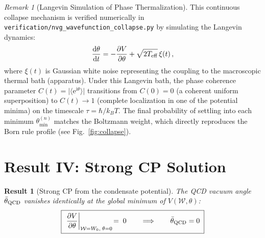 \documentclass[12pt,a4paper]{article}
\theoremstyle{plain}
\newtheorem{result}{Result}
\theoremstyle{definition}
\theoremstyle{remark}
\newtheorem*{remark}{Remark}
\newcommand{\hb}{\hbar}
\newcommand{\kB}{k_{\!B}}
\newcommand{\Wc}{\mathcal{W}}
\newcommand{\dd}{\mathrm{d}}
\newcommand{\ee}{\mathrm{e}}
\newcommand{\ii}{\mathrm{i}}
\begin{document}
\begin{remark}[Langevin Simulation of Phase Thermalization]
This continuous collapse mechanism is verified numerically in \texttt{verification/nvg\_wavefunction\_collapse.py} by simulating the Langevin dynamics:
\begin{equation}
  \frac{\dd\theta}{\dd t} = -\frac{\partial V}{\partial\theta} + \sqrt{2 T_{\rm eff}}\,\xi(t)\,,
\end{equation}
where $\xi(t)$ is Gaussian white noise representing the coupling to the macroscopic thermal bath (apparatus). Under this Langevin bath, the phase coherence parameter $C(t) = \bigl|\langle\ee^{\ii\theta}\rangle\bigr|$ transitions from $C(0) = 0$ (a coherent uniform superposition) to $C(t) \to 1$ (complete localization in one of the potential minima) on the timescale $\tau = \hb/\kB T$. The final probability of settling into each minimum $\theta_{\min}^{(n)}$ matches the Boltzmann weight, which directly reproduces the Born rule profile (see Fig.~\ref{fig:collapse}).
\end{remark}


\section{Result IV: Strong CP Solution}\label{sec:IV}

\begin{result}[Strong CP from the condensate potential]
\label{thm:cp}
The QCD vacuum angle $\bar\theta_{\rm QCD}$ vanishes identically
at the global minimum of $V(\Wc,\theta)$:
\begin{equation}\label{eq:CP}
  \boxed{\;
  \left.\frac{\partial V}{\partial\theta}
  \right|_{\Wc = W_0,\;\theta = 0}
  \!=\; 0
  \qquad\Longrightarrow\qquad
  \bar\theta_{\rm QCD} = 0
  \;}
\end{equation}
\end{result}
\end{document}
